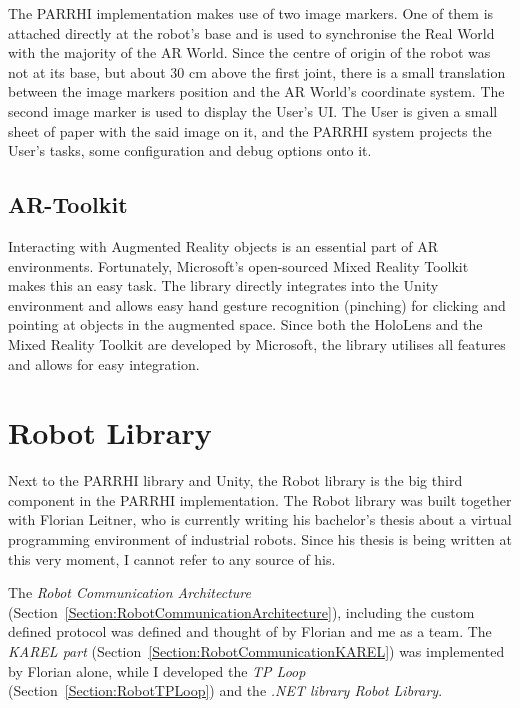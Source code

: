 The PARRHI implementation makes use of two image markers. One of them is attached directly at the robot's base and is used to synchronise the Real World with the majority of the AR World. Since the centre of origin of the robot was not at its base, but about 30 cm above the first joint, there is a small translation between the image markers position and the AR World's coordinate system. The second image marker is used to display the User's UI. The User is given a small sheet of paper with the said image on it, and the PARRHI system projects the User's tasks, some configuration and debug options onto it.


\subsection{AR-Toolkit}
Interacting with Augmented Reality objects is an essential part of AR environments. Fortunately, Microsoft's open-sourced Mixed Reality Toolkit~\cite{MicrosoftMRToolkit} makes this an easy task. The library directly integrates into the Unity environment and allows easy hand gesture recognition (pinching) for clicking and pointing at objects in the augmented space. Since both the HoloLens and the Mixed Reality Toolkit are developed by Microsoft, the library utilises all features and allows for easy integration.


\section{Robot Library}\label{Section:RobotLibrary}
Next to the PARRHI library and Unity, the Robot library is the big third component in the PARRHI implementation. The Robot library was built together with Florian Leitner, who is currently writing his bachelor's thesis about a virtual programming environment of industrial robots. Since his thesis is being written at this very moment, I cannot refer to any source of his. 

The \textit{Robot Communication Architecture} (Section~\ref{Section:RobotCommunicationArchitecture}), including the custom defined protocol was defined and thought of by Florian and me as a team. The \textit{KAREL part} (Section~\ref{Section:RobotCommunicationKAREL}) was implemented by Florian alone, while I developed the \textit{TP Loop} (Section~\ref{Section:RobotTPLoop}) and the \textit{.NET library Robot Library}.


